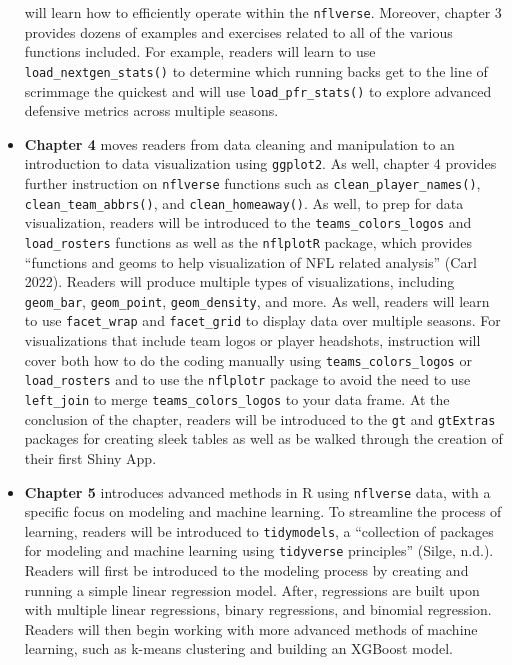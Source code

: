 \documentclass[
  letterpaper,
]{krantz}
\begin{document}
\begin{itemize}
  will learn how to efficiently operate within the \texttt{nflverse}.
  Moreover, chapter 3 provides dozens of examples and exercises related
  to all of the various functions included. For example, readers will
  learn to use \texttt{load\_nextgen\_stats()} to determine which
  running backs get to the line of scrimmage the quickest and will use
  \texttt{load\_pfr\_stats()} to explore advanced defensive metrics
  across multiple seasons.
\item
  \textbf{Chapter 4} moves readers from data cleaning and manipulation
  to an introduction to data visualization using \texttt{ggplot2}. As
  well, chapter 4 provides further instruction on \texttt{nflverse}
  functions such as \texttt{clean\_player\_names()},
  \texttt{clean\_team\_abbrs()}, and \texttt{clean\_homeaway()}. As
  well, to prep for data visualization, readers will be introduced to
  the \texttt{teams\_colors\_logos} and \texttt{load\_rosters} functions
  as well as the \texttt{nflplotR} package, which provides ``functions
  and geoms to help visualization of NFL related analysis'' (Carl 2022).
  Readers will produce multiple types of visualizations, including
  \texttt{geom\_bar}, \texttt{geom\_point}, \texttt{geom\_density}, and
  more. As well, readers will learn to use \texttt{facet\_wrap} and
  \texttt{facet\_grid} to display data over multiple seasons. For
  visualizations that include team logos or player headshots,
  instruction will cover both how to do the coding manually using
  \texttt{teams\_colors\_logos} or \texttt{load\_rosters} and to use the
  \texttt{nflplotr} package to avoid the need to use \texttt{left\_join}
  to merge \texttt{teams\_colors\_logos} to your data frame. At the
  conclusion of the chapter, readers will be introduced to the
  \texttt{gt} and \texttt{gtExtras} packages for creating sleek tables
  as well as be walked through the creation of their first Shiny App.
\item
  \textbf{Chapter 5} introduces advanced methods in R using
  \texttt{nflverse} data, with a specific focus on modeling and machine
  learning. To streamline the process of learning, readers will be
  introduced to \texttt{tidymodels}, a ``collection of packages for
  modeling and machine learning using \texttt{tidyverse} principles''
  (Silge, n.d.). Readers will first be introduced to the modeling
  process by creating and running a simple linear regression model.
  After, regressions are built upon with multiple linear regressions,
  binary regressions, and binomial regression. Readers will then begin
  working with more advanced methods of machine learning, such as
  k-means clustering and building an XGBoost model.
\end{itemize}
\end{document}
